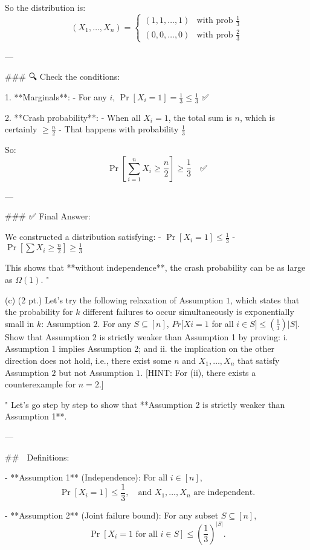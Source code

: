 So the distribution is:
\[
(X_1, \dots, X_n) =
\begin{cases}
(1, 1, \dots, 1) & \text{with prob } \frac{1}{3} \\
(0, 0, \dots, 0) & \text{with prob } \frac{2}{3}
\end{cases}
\]

---

### 🔍 Check the conditions:

1. **Marginals**:
   - For any \( i \), \( \Pr[X_i = 1] = \frac{1}{3} \le \frac{1}{3} \) ✅

2. **Crash probability**:
   - When all \( X_i = 1 \), the total sum is \( n \), which is certainly \( \ge \frac{n}{2} \)
   - That happens with probability \( \frac{1}{3} \)

   So:
   \[
   \Pr\left[\sum_{i=1}^n X_i \ge \frac{n}{2} \right] \ge \frac{1}{3} \quad \text{✅}
   \]

---

### ✅ Final Answer:

We constructed a distribution satisfying:
- \( \Pr[X_i = 1] \le \frac{1}{3} \)
- \( \Pr\left[\sum X_i \ge \frac{n}{2} \right] \ge \frac{1}{3} \)

This shows that **without independence**, the crash probability can be as large as \( \boxed{\Omega(1)} \).
"

(c) (2 pt.) Let's try the following relaxation of Assumption $1$, which states that the probability for $k$ different failures to occur simultaneously is exponentially small in $k$:
Assumption $2$. For any $S ⊆ [n]$, $Pr [Xi = 1$ for all $i \in S] \le (\frac{1}{3})|S|$.
Show that Assumption $2$ is strictly weaker than Assumption 1 by proving:
i. Assumption 1 implies Assumption 2; and
ii. the implication on the other direction does not hold, i.e., there exist some $n$ and $X_1, \dots, X_n$ that satisfy Assumption $2$ but not Assumption $1$.
[HINT: For (ii), there exists a counterexample for $n = 2$.]

"
Let's go step by step to show that **Assumption 2 is strictly weaker than Assumption 1**.

---

## 🔷 Definitions:

- **Assumption 1** (Independence):  
  For all \( i \in [n] \),  
  \[
  \Pr[X_i = 1] \le \frac{1}{3}, \quad \text{and } X_1, \dots, X_n \text{ are independent}.
  \]

- **Assumption 2** (Joint failure bound):  
  For any subset \( S \subseteq [n] \),  
  \[
  \Pr[X_i = 1 \text{ for all } i \in S] \le \left(\frac{1}{3}\right)^{|S|}.
  \]

